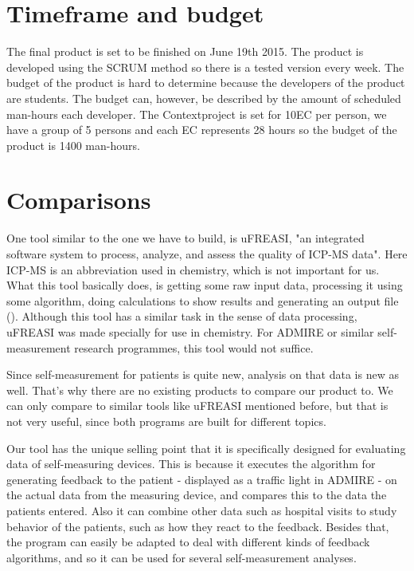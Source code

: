 \documentclass[11pt,twoside,a4paper]{article}
\begin{document}
\section{Timeframe and budget}
The final product is set to be finished on June 19th 2015. The product is developed using the SCRUM method so there is a tested version every week. The budget of the product is hard to determine because the developers of the product are students. The budget can, however, be described by the amount of scheduled man-hours each developer. The Contextproject is set for 10EC per person, we have a group of 5 persons and each EC represents 28 hours so the budget of the product is 1400 man-hours.

\newpage
\section{Comparisons}
One tool similar to the one we have to build, is uFREASI, "an integrated software system to process, analyze, and assess the quality of ICP-MS data". Here ICP-MS is an abbreviation used in chemistry, which is not important for us. What this tool basically does, is getting some raw input data, processing it using some algorithm, doing calculations to show results and generating an output file (\cite{UFREASI}).
Although this tool has a similar task in the sense of data processing, uFREASI was made specially for use in chemistry. For ADMIRE or similar self-measurement research programmes, this tool would not suffice.

Since self-measurement for patients is quite new, analysis on that data is new as well. That's why there are no existing products to compare our product to. We can only compare to similar tools like uFREASI mentioned before, but that is not very useful, since both programs are built for different topics. 

Our tool has the unique selling point that it is specifically designed for evaluating data of self-measuring devices. This is because it executes the algorithm for generating feedback to the patient - displayed as a traffic light in ADMIRE - on the actual data from the measuring device, and compares this to the data the patients entered. Also it can combine other data such as hospital visits to study behavior of the patients, such as how they react to the feedback. Besides that, the program can easily be adapted to deal with different kinds of feedback algorithms, and so it can be used for several self-measurement analyses.


\printbibliography[heading=bibintoc]
\end{document}
